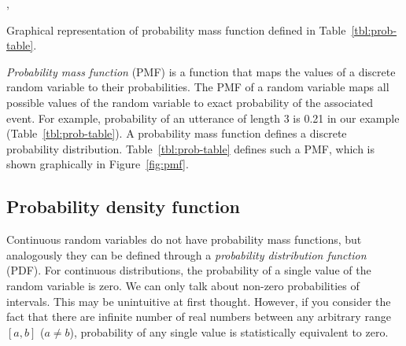 \begin{marginfigure}[4ex]
  ,
  \caption{\label{fig:pmf}Graphical representation of probability mass function defined in Table~\ref{tbl:prob-table}.}
\end{marginfigure}
\emph{Probability mass function} (PMF) is a function that maps
the values of a discrete random variable to their probabilities.
The PMF of a random variable maps all possible values of the random variable
to exact probability of the associated event.
For example, probability of
an utterance of length \num{3} is \num{0.21} in our example (Table~\ref{tbl:prob-table}).
A probability mass function defines a discrete probability distribution.
Table~\ref{tbl:prob-table} defines such a PMF,
which is shown graphically in Figure~\ref{fig:pmf}.

\subsection{Probability density function}

Continuous random variables do not have probability mass functions,
but analogously they can be defined through
a \emph{probability distribution function} (PDF).
For continuous distributions,
the probability of a single value of the random variable is zero.
We can only talk about non-zero probabilities of intervals.
This may be unintuitive at first thought.
However, if you consider the fact that there are infinite number of real numbers
between any arbitrary range $[a, b]$ ($a \ne b$),
probability of any single value is statistically equivalent to zero.

